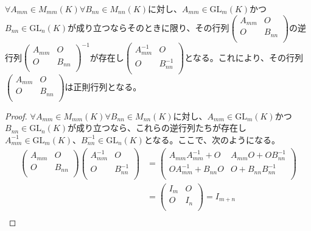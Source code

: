 \documentclass[dvipdfmx]{jsarticle}
\begin{document}
\begin{thm}\label{2.1.8.2}
$\forall A_{mm} \in M_{mm}(K)\forall B_{nn} \in M_{nn}(K)$に対し、$A_{mm} \in {\mathrm{GL}}_{m}(K)$かつ$B_{nn} \in {\mathrm{GL}}_{n}(K)$が成り立つならそのときに限り、その行列$\begin{pmatrix}
A_{mm} & O \\
O & B_{nn} \\
\end{pmatrix}$の逆行列$\begin{pmatrix}
A_{mm} & O \\
O & B_{nn} \\
\end{pmatrix}^{- 1}$が存在し$\begin{pmatrix}
A_{mm}^{- 1} & O \\
O & B_{nn}^{- 1} \\
\end{pmatrix}$となる。これにより、その行列$\begin{pmatrix}
A_{mm} & O \\
O & B_{nn} \\
\end{pmatrix}$は正則行列となる。
\end{thm}\begin{proof}
$\forall A_{mm} \in M_{mm}(K)\forall B_{nn} \in M_{nn}(K)$に対し、$A_{mm} \in {\mathrm{GL}}_{m}(K)$かつ$B_{nn} \in {\mathrm{GL}}_{n}(K)$が成り立つなら、これらの逆行列たちが存在し$A_{mm}^{- 1} \in {\mathrm{GL}}_{m}(K)$、$B_{nn}^{- 1} \in {\mathrm{GL}}_{n}(K)$となる。ここで、次のようになる。
\begin{align*}
\begin{pmatrix}
A_{mm} & O \\
O & B_{nn} \\
\end{pmatrix}\begin{pmatrix}
A_{mm}^{- 1} & O \\
O & B_{nn}^{- 1} \\
\end{pmatrix} &= \begin{pmatrix}
A_{mm}A_{mm}^{- 1} + O & A_{mm}O + OB_{nn}^{- 1} \\
OA_{mm}^{- 1} + B_{nn}O & O + B_{nn}B_{nn}^{- 1} \\
\end{pmatrix}\\
&= \begin{pmatrix}
I_{m} & O \\
O & I_{n} \\
\end{pmatrix} = I_{m + n}\\

\end{align*}
\end{proof}
\end{document}
